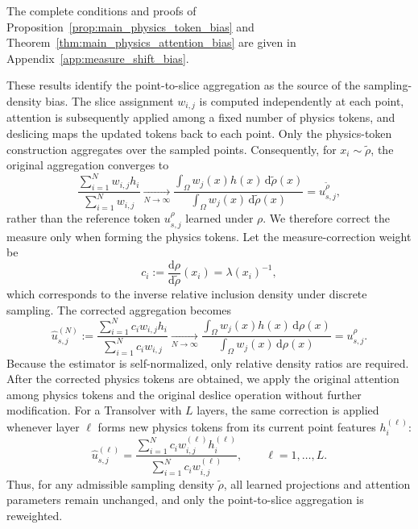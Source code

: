 \documentclass{article}
\begin{document}
The complete conditions and proofs of Proposition~\ref{prop:main_physics_token_bias} and Theorem~\ref{thm:main_physics_attention_bias} are given in Appendix~\ref{app:measure_shift_bias}.

These results identify the point-to-slice aggregation as the source of the sampling-density bias. The slice assignment $w_{i,j}$ is computed independently at each point, attention is subsequently applied among a fixed number of physics tokens, and deslicing maps the updated tokens back to each point. Only the physics-token construction aggregates over the sampled points. Consequently, for $x_i\sim\widetilde{\rho}$, the original aggregation converges to
\begin{equation}
    \frac{\sum_{i=1}^{N}w_{i,j}h_i}{\sum_{i=1}^{N}w_{i,j}}
    \xrightarrow[N\to\infty]{}
    \frac{\int_{\Omega}w_j(x)h(x)\,\mathrm{d}\widetilde{\rho}(x)}{\int_{\Omega}w_j(x)\,\mathrm{d}\widetilde{\rho}(x)}
    =u_{s,j}^{\widetilde{\rho}},
    \label{eq:uncorrected_shifted_physics_token}
\end{equation}
rather than the reference token $u_{s,j}^{\rho}$ learned under $\rho$. We therefore correct the measure only when forming the physics tokens.
Let the measure-correction weight be
\begin{equation}
    c_i
    := \frac{\mathrm{d}\rho}{\mathrm{d}\widetilde{\rho}}(x_i)
    = \lambda(x_i)^{-1},
    \label{eq:main_importance_weight}
\end{equation}
which corresponds to the inverse relative inclusion density under discrete sampling.
The corrected aggregation becomes
\begin{equation}
    \widehat{u}_{s,j}^{(N)}
    :=\frac{\sum_{i=1}^{N}c_iw_{i,j}h_i}{\sum_{i=1}^{N}c_iw_{i,j}}
    \xrightarrow[N\to\infty]{}
    \frac{\int_{\Omega}w_j(x)h(x)\,\mathrm{d}\rho(x)}{\int_{\Omega}w_j(x)\,\mathrm{d}\rho(x)}
    =u_{s,j}^{\rho}.
    \label{eq:density_consistent_physics_token}
\end{equation}
Because the estimator is self-normalized, only relative density ratios are required. After the corrected physics tokens are obtained, we apply the original attention among physics tokens and the original deslice operation without further modification. For a Transolver with $L$ layers, the same correction is applied whenever layer $\ell$ forms new physics tokens from its current point features $h_i^{(\ell)}$:
\begin{equation}
    \widehat{u}_{s,j}^{(\ell)}
    =\frac{\sum_{i=1}^{N}c_iw_{i,j}^{(\ell)}h_i^{(\ell)}}{\sum_{i=1}^{N}c_iw_{i,j}^{(\ell)}},
    \qquad \ell=1,\ldots,L.
    \label{eq:layerwise_density_correction}
\end{equation}
Thus, for any admissible sampling density \(\widetilde{\rho}\), all learned projections and attention parameters remain unchanged, and only the point-to-slice aggregation is reweighted.
\end{document}
